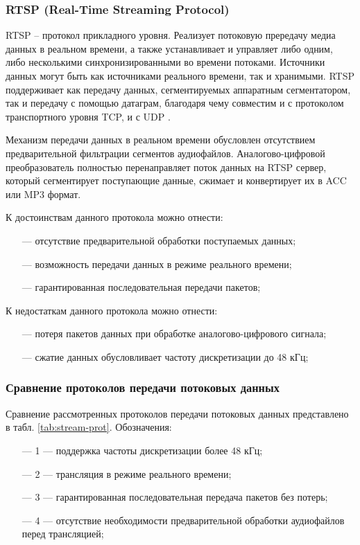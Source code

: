 	\subsubsection{RTSP (Real-Time Streaming Protocol)}

		\par RTSP – протокол прикладного уровня. 
		Реализует потоковую прередачу медиа данных в реальном времени, а также устанавливает и управляет либо одним, либо несколькими синхронизированными во времени потоками.
		Источники данных могут быть как источниками реального времени, так и хранимыми.
		RTSP поддерживает как передачу данных, сегментируемых аппаратным сегментатором, так и передачу с помощью датаграм, благодаря чему совместим и с протоколом транспортного уровня TCP, и с UDP \cite{udp}.

		\par Механизм передачи данных в реальном времени обусловлен отсутствием предварительной фильтрации сегментов аудиофайлов. 
		Аналогово-цифровой преобразователь полностью перенаправляет поток данных на RTSP сервер, который сегментирует поступающие данные, 
		сжимает и конвертирует их в ACC или MP3 формат.

		\par К достоинствам данного протокола можно отнести:
		\begin{itemize}[leftmargin=1.6\parindent]
			\item[---] отсутствие предварительной обработки поступаемых данных;
			\item[---] возможность передачи данных в режиме реального времени;
			\item[---] гарантированная последовательная передачи пакетов;
		\end{itemize}

		\par К недостаткам данного протокола можно отнести:
		\begin{itemize}[leftmargin=1.6\parindent]
			\item[---] потеря пакетов данных при обработке аналогово-цифрового сигнала;
			\item[---] сжатие данных обусловливает частоту дискретизации до 48 кГц;
		\end{itemize}
	
	\subsubsection{Сравнение протоколов передачи потоковых данных}
		Сравнение рассмотренных протоколов передачи потоковых данных представлено в табл. \ref{tab:stream-prot}. 
		Обозначения:
		\begin{itemize}
			\item[---] 1 --- поддержка частоты дискретизации более 48 кГц;
			\item[---] 2 --- трансляция в режиме реального времени;
			\item[---] 3 --- гарантированная последовательная передача пакетов без потерь;
			\item[---] 4 --- отсутствие необходимости предварительной обработки аудиофайлов перед трансляцией;  
		\end{itemize}

